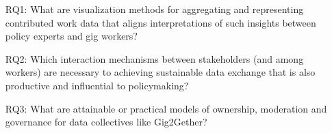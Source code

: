 \begin{enumerate}
    \item[RQ1:] What are visualization methods for aggregating and representing contributed work data that aligns interpretations of such insights between policy experts and gig workers?  \\
    \item[RQ2:] Which interaction mechanisms between stakeholders (and among workers) are necessary to achieving sustainable data exchange that is also  productive and influential to policymaking?
    \item[RQ3:] What are attainable or practical models of ownership, moderation and governance for data collectives like Gig2Gether?
\end{enumerate}

